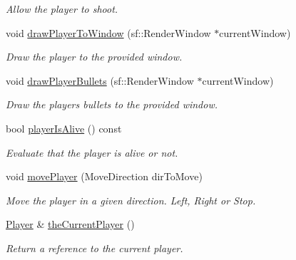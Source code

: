 \begin{DoxyCompactItemize}
\begin{DoxyCompactList}\small\item\em Allow the player to shoot. \end{DoxyCompactList}\item 
void \hyperlink{class_player_manager_a8dfbc91721f7c9cfeae80ae7fa89602e}{draw\+Player\+To\+Window} (sf\+::\+Render\+Window $\ast$current\+Window)
\begin{DoxyCompactList}\small\item\em Draw the player to the provided window. \end{DoxyCompactList}\item 
void \hyperlink{class_player_manager_a503d878624b53851c6fa25559630f544}{draw\+Player\+Bullets} (sf\+::\+Render\+Window $\ast$current\+Window)
\begin{DoxyCompactList}\small\item\em Draw the player\textquotesingle{}s bullets to the provided window. \end{DoxyCompactList}\item 
\mbox{\label{class_player_manager_ab927a10c2c602c42daf2e11eb8861692}} 
bool \hyperlink{class_player_manager_ab927a10c2c602c42daf2e11eb8861692}{player\+Is\+Alive} () const
\begin{DoxyCompactList}\small\item\em Evaluate that the player is alive or not. \end{DoxyCompactList}\item 
void \hyperlink{class_player_manager_a95358a4f97cf343f5d5d01a440c5dc76}{move\+Player} (Move\+Direction dir\+To\+Move)
\begin{DoxyCompactList}\small\item\em Move the player in a given direction. Left, Right or Stop. \end{DoxyCompactList}\item 
\mbox{\label{class_player_manager_aa70cd9ab8f7a582c27bef02e12a408e7}} 
\hyperlink{class_player}{Player} \& \hyperlink{class_player_manager_aa70cd9ab8f7a582c27bef02e12a408e7}{the\+Current\+Player} ()
\begin{DoxyCompactList}\small\item\em Return a reference to the current player. \end{DoxyCompactList}\item 
\mbox{\label{class_player_manager_afbce199fe8a661b8002ae94b8396c7aa}} 

\end{DoxyCompactItemize}
